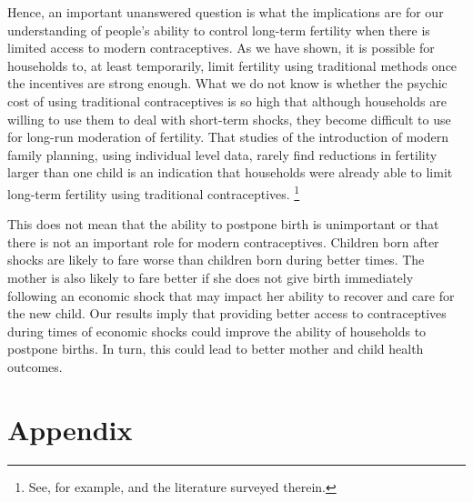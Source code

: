 \documentclass[letterpaper,12pt]{article}
\begin{document}
Hence, an important unanswered question is what the implications
are for our understanding of people's ability to control long-term
fertility when there is limited access to modern contraceptives.
As we have shown, it is possible for households to, at least temporarily, 
limit fertility using traditional methods once the incentives are
strong enough.
What we do not know is whether the psychic cost of using traditional 
contraceptives is so high that although households are willing to use 
them to deal with short-term shocks, they become difficult to use for 
long-run moderation of fertility.
That studies of the introduction of modern family planning, using individual
level data, rarely find reductions in fertility larger than one child
is an indication that households were already able to limit long-term 
fertility using traditional contraceptives.%
\footnote{
See, for example, \cite{Portner2014a} and the literature surveyed therein.
}

This does not mean that the ability to postpone birth is unimportant
or that there is not an important role for modern contraceptives.
Children born after shocks are likely to fare worse than children born 
during better times.
The mother is also likely to fare better if she does not give birth 
immediately following an economic shock that may impact her ability 
to recover and care for the new child.
Our results imply that providing better access to contraceptives 
during times of economic shocks could improve the ability of households 
to postpone births.
In turn, this could lead to better mother and child health outcomes.



\clearpage

\newpage




\clearpage


\appendix

\renewcommand\thetable{A-\arabic{table}}
\renewcommand\thefigure{A-\arabic{figure}}
\setcounter{table}{0}
\setcounter{figure}{0}

\section{Appendix}

\end{document}
